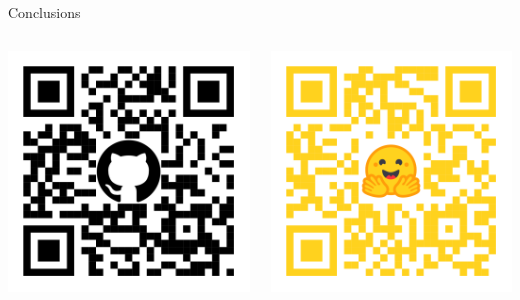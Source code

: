 \documentclass{beamer}
\begin{document}
\begin{frame}{Conclusions}
{\centering
\begin{columns}
    \begin{column}{0.2\textwidth}
        \includegraphics[width=\linewidth]{images/env-qr.png}
    \end{column}
    \begin{column}{0.2\textwidth}
        \includegraphics[width=\linewidth]{images/space-qr.png}
    \end{column}
\end{columns}
}

\end{frame}
\end{document}
